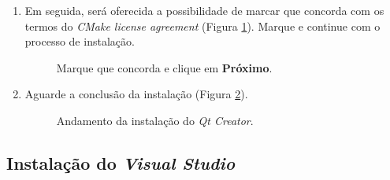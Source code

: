 \documentclass[a4paper,11pt]{article}
\newcommand{\qtcreator}{\textit{Qt Creator}}
\newcommand{\visualstudio}{\textit{Visual Studio}}
\begin{document}
\begin{enumerate}
\item Em seguida, será oferecida a possibilidade de marcar que concorda com os termos do \textit{CMake license agreement} (Figura \ref{fig:qt_mark_read}). Marque e continue com o processo de instalação.

\begin{figure}[H]
	\centering
	\caption{ Marque que concorda e clique em \textbf{Próximo}.}
	\label{fig:qt_mark_read}
\end{figure}

\item Aguarde a conclusão da instalação (Figura \ref{fig:qt_wait_inst_finish}).

\begin{figure}[H]
	\centering
	\caption{Andamento da instalação do \qtcreator{}.}
	\label{fig:qt_wait_inst_finish}
\end{figure}

\end{enumerate}



\subsection{Instalação do \visualstudio{}}
\end{document}
